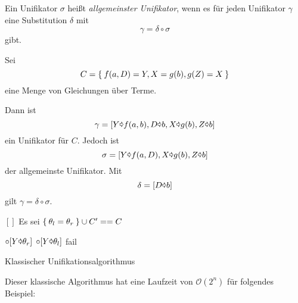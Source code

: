 \begin{definition}%
    Ein Unifikator $\sigma$ heißt \textit{allgemeinster Unifikator}, wenn 
    es für jeden Unifikator $\gamma$ eine Substitution $\delta$ mit
    \[\gamma = \delta \circ \sigma\]
    gibt.
\end{definition}

\begin{beispiel}
    Sei
    \[C = \Set{f(a,D) = Y, X = g(b), g(Z) = X}\]
    eine Menge von Gleichungen über Terme.

    Dann ist 
    \[\gamma = [Y \text{\pointer} f(a,b), D \text{\pointer} b, X \text{\pointer} g(b), Z \text{\pointer} b]\]
    ein Unifikator für $C$. Jedoch ist
    \[\sigma = [Y \text{\pointer} f(a,D), X \text{\pointer} g(b), Z \text{\pointer} b]\]
    der allgemeinste Unifikator. Mit
    \[\delta = [D \text{\pointer} b]\]
    gilt $\gamma = \delta \circ \sigma$.
\end{beispiel}

\begin{algorithm}[h]
    \begin{algorithmic}
            \State \Return $[]$
        \Else
            \State Es sei $\Set{\theta_l = \theta_r} \cup C' == C$

                \State {}
                \State {} $\circ [Y \text{\pointer} \theta_r]$
                \State {} $\circ [Y \text{\pointer} \theta_l]$
                \State {}
            \Else
                \State fail
            \EndIf
        \EndIf
        \EndFunction
    \end{algorithmic}
\caption{Klassischer Unifikationsalgorithmus}
\label{alg:klassischer-unifikationsalgorithmus}
\end{algorithm}

Dieser klassische Algorithmus hat eine Laufzeit von $\mathcal{O}(2^n)$ für folgendes
Beispiel:

